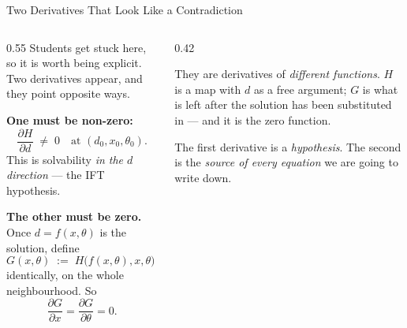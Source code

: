 \begin{frame}{Two Derivatives That Look Like a Contradiction}
\begin{columns}[T]
\begin{column}{0.55\textwidth}
\small
Students get stuck here, so it is worth being explicit. Two derivatives appear, and they point opposite ways.
\medskip

\textbf{One must be non-zero:}
\[
  \frac{\partial H}{\partial d}\;\neq\;0
  \quad\text{at }(d_0,x_0,\theta_0).
\]
This is solvability \emph{in the $d$ direction} --- the IFT hypothesis.
\medskip

\textbf{The other must be zero.} Once $d=f(x,\theta)$ is the solution, define
\[
  G(x,\theta)\;:=\;H\big(f(x,\theta),x,\theta\big)\;\equiv\;0 ,
\]
identically, on the whole neighbourhood. So
\[
  \frac{\partial G}{\partial x}=\frac{\partial G}{\partial \theta}=0 .
\]
\end{column}
\begin{column}{0.42\textwidth}
\begin{conceptbox}[title=\textbf{No contradiction}]\small
They are derivatives of \emph{different functions}. $H$ is a map with $d$ as a free argument; $G$ is what is left after the solution has been substituted in --- and it is the zero function.
\end{conceptbox}
\medskip
\begin{takeawaybox}\footnotesize
The first derivative is a \emph{hypothesis}. The second is the \emph{source of every equation} we are going to write down.
\end{takeawaybox}
\end{column}
\end{columns}
\vspace{1mm}
\end{frame}

